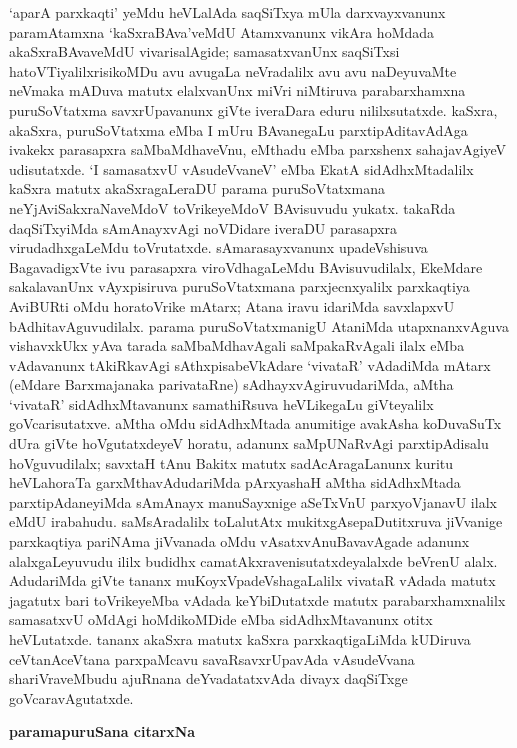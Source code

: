 `aparA parxkaqti' yeMdu heVLalAda saqSiTxya mUla darxvayxvanunx paramAtamxna `kaSxraBAva'veMdU Atamxvanunx vikAra hoMdada akaSxraBAvaveMdU vivarisalAgide; samasatxvanUnx saqSiTxsi hatoVTiyalilxrisikoMDu avu avugaLa neVradalilx avu avu naDeyuvaMte neVmaka mADuva matutx elalxvanUnx miVri niMtiruva parabarxhamxna puruSoVtatxma savxrUpavanunx giVte iveraDara eduru nililxsutatxde. kaSxra, akaSxra, puruSoVtatxma eMba I mUru BAvanegaLu parxtipAditavAdAga ivakekx parasapxra saMbaMdhaveVnu, eMthadu eMba parxshenx sahajavAgiyeV udisutatxde. `I samasatxvU vAsudeVvaneV' eMba EkatA sidAdhxMtadalilx kaSxra matutx akaSxragaLeraDU parama puruSoVtatxmana neYjAviSakxraNaveMdoV toVrikeyeMdoV BAvisuvudu yukatx. takaRda daqSiTxyiMda sAmAnayxvAgi noVDidare iveraDU parasapxra virudadhxgaLeMdu toVrutatxde. sAmarasayxvanunx upadeVshisuva BagavadigxVte ivu parasapxra viroVdhagaLeMdu BAvisuvudilalx, EkeMdare sakalavanUnx vAyxpisiruva puruSoVtatxmana parxjecnxyalilx parxkaqtiya AviBURti oMdu horatoVrike mAtarx; Atana iravu idariMda savxlapxvU bAdhitavAguvudilalx. parama puruSoVtatxmanigU AtaniMda utapxnanxvAguva vishavxkUkx yAva tarada saMbaMdhavAgali saMpakaRvAgali ilalx eMba vAdavanunx tAkiRkavAgi sAthxpisabeVkAdare `vivataR' vAdadiMda mAtarx (eMdare Barxmajanaka parivataRne) sAdhayxvAgiruvudariMda, aMtha `vivataR' sidAdhxMtavanunx samathiRsuva heVLikegaLu giVteyalilx goVcarisutatxve. aMtha oMdu sidAdhxMtada anumitige avakAsha koDuvaSuTx dUra giVte hoVgutatxdeyeV horatu, adanunx saMpUNaRvAgi parxtipAdisalu hoVguvudilalx; savxtaH tAnu Bakitx matutx sadAcAragaLanunx kuritu heVLahoraTa garxMthavAdudariMda pArxyashaH aMtha sidAdhxMtada parxtipAdaneyiMda sAmAnayx manuSayxnige aSeTxVnU parxyoVjanavU ilalx eMdU irabahudu. saMsAradalilx toLalutAtx mukitxgAsepaDutitxruva jiVvanige parxkaqtiya pariNAma jiVvanada oMdu vAsatxvAnuBavavAgade adanunx alalxgaLeyuvudu ililx budidhx camatAkxravenisutatxdeyalalxde beVrenU alalx. AdudariMda giVte tananx muKoyxVpadeVshagaLalilx vivataR vAdada matutx jagatutx bari toVrikeyeMba vAdada keYbiDutatxde matutx parabarxhamxnalilx samasatxvU oMdAgi hoMdikoMDide eMba sidAdhxMtavanunx otitx heVLutatxde. tananx akaSxra matutx kaSxra parxkaqtigaLiMda kUDiruva ceVtanAceVtana parxpaMcavu savaRsavxrUpavAda vAsudeVvana shariVraveMbudu ajuRnana deYvadatatxvAda divayx daqSiTxge goVcaravAgutatxde.

\begin{center}
\textbf{\Large{paramapuruSana citarxNa}}
\end{center}

